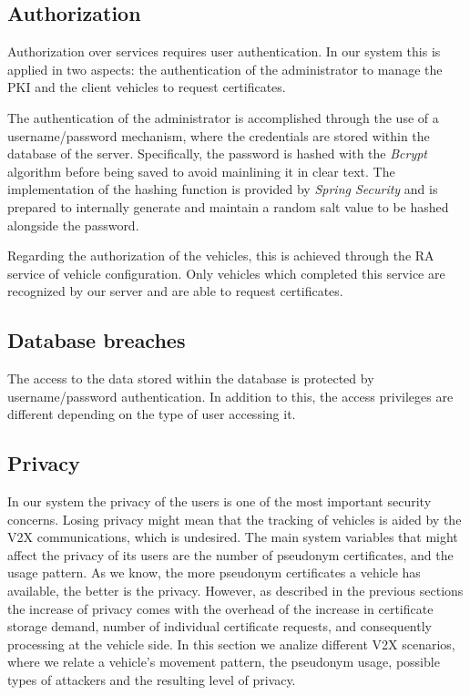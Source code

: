 \subsection{Authorization}
Authorization over services requires user authentication. In our system this is applied in two aspects: the authentication of the administrator to manage the PKI and the client vehicles to request certificates. 

The authentication of the administrator is accomplished through the use of a username/password mechanism, where the credentials are stored within the database of the server. Specifically, the password is hashed with the \textit{Bcrypt} algorithm before being saved to avoid mainlining it in clear text. The implementation of the hashing function is provided by \textit{Spring Security} and is prepared to internally generate and maintain a random salt value to be hashed alongside the password.

Regarding the authorization of the vehicles, this is achieved through the RA service of vehicle configuration. Only vehicles which completed this service are recognized by our server and are able to request certificates.
  
\subsection{Database breaches}
The access to the data stored within the database is protected by username/password authentication. In addition to this, the access privileges are different depending on the type of user accessing it.

\subsection{Privacy}
In our system the privacy of the users is one of the most important security concerns. Losing privacy might mean that the tracking of vehicles is aided by the V2X communications, which is undesired. The main system variables that might affect the privacy of its users are the number of pseudonym certificates, and the usage pattern. As we know, the more pseudonym certificates a vehicle has available, the better is the privacy. However, as described in the previous sections the increase of privacy comes with the overhead of the increase in certificate storage demand, number of individual certificate requests, and consequently processing at the vehicle side. In this section we analize different V2X scenarios, where we relate a vehicle's movement pattern, the pseudonym usage, possible types of attackers and the resulting level of privacy.

